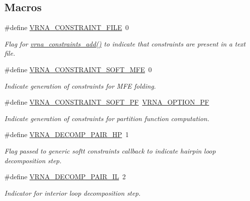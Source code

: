 \subsection*{Macros}
\begin{DoxyCompactItemize}
\item 
\#define \hyperlink{group__constraints_ga62e0ed0c33002c09423de4e646f85a2b}{V\+R\+N\+A\+\_\+\+C\+O\+N\+S\+T\+R\+A\+I\+N\+T\+\_\+\+F\+I\+L\+E}~0
\begin{DoxyCompactList}\small\item\em Flag for \hyperlink{group__constraints_ga35a401f680969a556858a8dd5f1d07cc}{vrna\+\_\+constraints\+\_\+add()} to indicate that constraints are present in a text file. \end{DoxyCompactList}\item 
\#define \hyperlink{group__constraints_ga62aa195893d02d1a79ca94952748df36}{V\+R\+N\+A\+\_\+\+C\+O\+N\+S\+T\+R\+A\+I\+N\+T\+\_\+\+S\+O\+F\+T\+\_\+\+M\+F\+E}~0
\begin{DoxyCompactList}\small\item\em Indicate generation of constraints for M\+F\+E folding. \end{DoxyCompactList}\item 
\#define \hyperlink{group__constraints_ga03fb5000c19b9a2082bf4ea30a543045}{V\+R\+N\+A\+\_\+\+C\+O\+N\+S\+T\+R\+A\+I\+N\+T\+\_\+\+S\+O\+F\+T\+\_\+\+P\+F}~\hyperlink{group__fold__compound_gabfbadcddda3e74ce7f49035ef8f058f7}{V\+R\+N\+A\+\_\+\+O\+P\+T\+I\+O\+N\+\_\+\+P\+F}
\begin{DoxyCompactList}\small\item\em Indicate generation of constraints for partition function computation. \end{DoxyCompactList}\item 
\#define \hyperlink{group__constraints_ga8bd41ebc8039378d242e4e8c273716a5}{V\+R\+N\+A\+\_\+\+D\+E\+C\+O\+M\+P\+\_\+\+P\+A\+I\+R\+\_\+\+H\+P}~1
\begin{DoxyCompactList}\small\item\em Flag passed to generic softt constraints callback to indicate hairpin loop decomposition step. \end{DoxyCompactList}\item 
\#define \hyperlink{group__constraints_gaeab04f34d7730cff2d651d782f95d857}{V\+R\+N\+A\+\_\+\+D\+E\+C\+O\+M\+P\+\_\+\+P\+A\+I\+R\+\_\+\+I\+L}~2
\begin{DoxyCompactList}\small\item\em Indicator for interior loop decomposition step. \end{DoxyCompactList}\item 

\end{DoxyCompactItemize}
